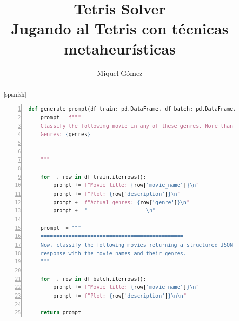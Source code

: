 \documentclass[11pt,spanish,listoffigures,listoftables]{tfgetsinf}
\title{Tetris Solver \\ Jugando al Tetris con técnicas metaheurísticas}
\author{Miquel Gómez}
\begin{document}
 




\begin{abstract}[spanish]

\begin{lstlisting}[language=Python, basicstyle=\ttfamily\small, frame=single, numbers=left, breaklines=true]
def generate_prompt(df_train: pd.DataFrame, df_batch: pd.DataFrame, genres: str) -> str:
    prompt = f"""
    Classify the following movie in any of these genres. More than one genre can be assigned.
    Genres: {genres}

    ==============================================
    """

    for _, row in df_train.iterrows():
        prompt += f"Movie title: {row['movie_name']}\n"
        prompt += f"Plot: {row['description']}\n"
        prompt += f"Actual genres: {row['genre']}\n"
        prompt += "-------------------\n"

    prompt += """
    ==============================================
    Now, classify the following movies returning a structured JSON
    response with the movie names and their genres.
    """

    for _, row in df_batch.iterrows():
        prompt += f"Movie title: {row['movie_name']}\n"
        prompt += f"Plot: {row['description']}\n\n"

    return prompt
\end{lstlisting}


\end{abstract}


\clearpage
\tableofcontents
\end{document}
